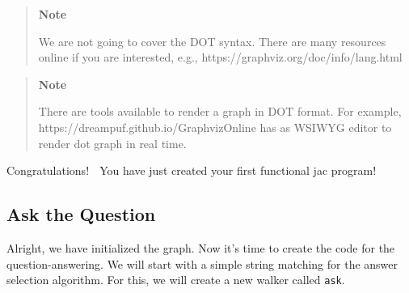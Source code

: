 \begin{quote}
    \textbf{Note}

    We are not going to cover the DOT syntax. There are many resources
    online if you are interested, e.g.,
    https://graphviz.org/doc/info/lang.html
\end{quote}

\begin{quote}
    \textbf{Note}

    There are tools available to render a graph in DOT format. For example,
    https://dreampuf.github.io/GraphvizOnline has as WSIWYG editor to render
    dot graph in real time.
\end{quote}

Congratulations! 🎉 You have just created your first functional jac
program!

\subsection{Ask the Question}\label{ask-the-question}

Alright, we have initialized the graph. Now it's time to create the code
for the question-answering. We will start with a simple string matching
for the answer selection algorithm. For this, we will create a new
walker called \texttt{ask}.

\begin{Shaded}
    \begin{Highlighting}[]
        \OperatorTok{\{}
        \OperatorTok{;}
        \OperatorTok{\{}
        \OperatorTok{=} \NormalTok{(}\NormalTok{)}\OperatorTok{;}
        \OperatorTok{-->} \OperatorTok{::}\OperatorTok{;}
        \OperatorTok{\}}
        \OperatorTok{\{}
        \OperatorTok{-->} \OperatorTok{::}\OperatorTok{=}\OperatorTok{;}
        \OperatorTok{\}}
        \OperatorTok{\{}
        \NormalTok{(}\NormalTok{)}\OperatorTok{;}
        \OperatorTok{\}}
        \OperatorTok{\}}
    \end{Highlighting}
\end{Shaded}

